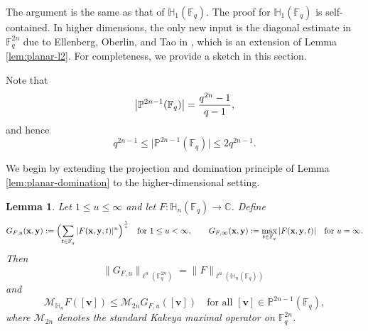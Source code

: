 \documentclass[11pt]{article}
\newtheorem{lemma}[theorem]{Lemma}
\newcommand{\1}{\mathbf 1}
\begin{document}
The argument is the same as that of $\mathbb{H}_1(\mathbb{F}_q)$. The proof for $\mathbb{H}_1(\mathbb{F}_q)$ is self-contained. In higher dimensions, the only new input is the diagonal estimate in $\mathbb{F}_q^{2n}$ due to Ellenberg, Oberlin, and Tao in \cite{EOT}, which is an extension of Lemma \ref{lem:planar-l2}. For completeness, we provide a sketch in this section.


Note that 
\begin{equation}\label{size-P^{2n-1}}
   \bigl|\mathbb{P}^{2n-1}(\mathbb{F}_q)\bigr|=\frac{q^{2n}-1}{q-1},
\end{equation}
and hence
\begin{equation}\label{eq:Psize}
q^{2n-1}\le \bigl|\mathbb{P}^{2n-1}(\mathbb{F}_q)\bigr|\le 2q^{2n-1}.
\end{equation}

We begin by extending the projection and domination principle of Lemma 
\ref{lem:planar-domination} to the higher-dimensional setting.

\begin{lemma}\label{lem:Hn_domination}
Let $1\le u\le \infty$ and let $F:\mathbb{H}_n(\mathbb{F}_q)\to\mathbb{C}$.
Define
\[
G_{F,u}(\mathbf x,\mathbf y):=\Bigl(\sum_{t\in\mathbb{F}_q}|F(\mathbf x, \mathbf y,t)|^u\Bigr)^{\frac{1}{u}}
\quad\text{for }1\le u<\infty,
\qquad
G_{F,\infty}(\mathbf x,\mathbf y):=\max_{t\in\mathbb{F}_q}|F(\mathbf x, \mathbf y,t)|
\quad\text{for }u=\infty.
\]
Then
\[
\|G_{F,u}\|_{\ell^u(\mathbb{F}_q^{2n})}=\|F\|_{\ell^u(\mathbb{H}_n(\mathbb{F}_q))}
\]
and
\[
\mathcal{M}_{\mathbb{H}_n}F([\mathbf{v}])\le \mathcal{M}_{2n}G_{F,u}([\mathbf{v}])
\quad\text{for all }[\mathbf{v}]\in \mathbb{P}^{2n-1}(\mathbb{F}_q),
\]
where $\mathcal{M}_{2n}$ denotes the standard Kakeya maximal operator on $\mathbb{F}_q^{2n}$.
\end{lemma}
\end{document}

